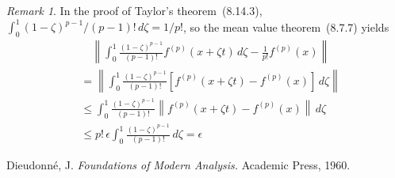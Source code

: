 \documentclass[letterpaper,12pt]{article}
\newcommand{\bignorm}[1]{\left\lVert{#1}\right\rVert}
\newcommand{\dzeta}{\,d\zeta}
\theoremstyle{plain}
\theoremstyle{definition}
\theoremstyle{remark}
\newtheorem*{rmk}{Remark}
\begin{document}
\begin{rmk}
In the proof of Taylor's theorem~(8.14.3), \(\int_0^1(1-\zeta)^{p-1}/(p-1)!\dzeta=1/p!\), so the mean value theorem~(8.7.7) yields
\begin{align*}
&\quad\bignorm{\int_0^1\frac{(1-\zeta)^{p-1}}{(p-1)!}f^{(p)}(x+\zeta t)\dzeta-\frac{1}{p!}f^{(p)}(x)}\\
&=\bignorm{\int_0^1\frac{(1-\zeta)^{p-1}}{(p-1)!}\left[f^{(p)}(x+\zeta t)-f^{(p)}(x)\right]\dzeta}\\
&\le\int_0^1\frac{(1-\zeta)^{p-1}}{(p-1)!}\bignorm{f^{(p)}(x+\zeta t)-f^{(p)}(x)}\dzeta\\
&\le p!\,\epsilon\int_0^1\frac{(1-\zeta)^{p-1}}{(p-1)!}\dzeta=\epsilon
\end{align*}
\end{rmk}

\begin{thebibliography}{0}
 Dieudonn\'e, J. \textit{Foundations of Modern Analysis.} Academic Press, 1960.
\end{thebibliography}
\end{document}
